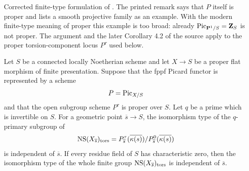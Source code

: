 \begin{lemma}
\label{lemma-picard-Neron-Severi-prime-primary-constant}
\begin{reference}
Corrected finite-type formulation of
\cite[Expos\'e 236, Remark 3.10, p. 241]{FGA}. The printed remark says that
$P$ itself is proper and lists a smooth projective family as an example. With
the modern finite-type meaning of proper this example is too broad: already
$\mathrm{Pic}_{\mathbf P^1/S}=\mathbf Z_S$ is not proper. The argument and
the later Corollary 4.2 of the source apply to the proper torsion-component
locus $P^\tau$ used below.
\end{reference}
Let $S$ be a connected locally Noetherian scheme and let $X\to S$ be a
proper flat morphism of finite presentation. Suppose that the fppf Picard
functor is represented by a scheme
$$
P=\mathrm{Pic}_{X/S}
$$
and that the open subgroup scheme $P^\tau$ is proper over $S$. Let $q$ be a
prime which is invertible on $S$. For a geometric point $\overline{s}\to S$,
the isomorphism type of the $q$-primary subgroup of
$$
\mathop{\rm NS}(X_{\overline{s}})_{\rm tors}
=P^\tau_{\overline{s}}(\overline{\kappa(s)})/
P^0_{\overline{s}}(\overline{\kappa(s)})
$$
is independent of $\overline{s}$. If every residue field of $S$ has
characteristic zero, then the isomorphism type of the whole finite group
$\mathop{\rm NS}(X_{\overline{s}})_{\rm tors}$ is independent of
$\overline{s}$.
\end{lemma}

